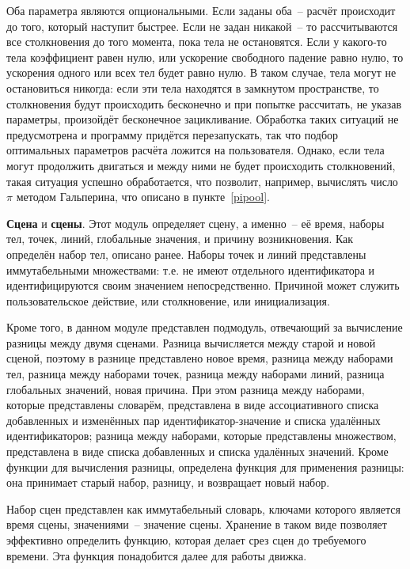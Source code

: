 Оба параметра являются опциональными. Если заданы оба~-- расчёт происходит до того, который наступит быстрее.
Если не задан никакой~-- то рассчитываются все столкновения до того момента, пока тела не остановятся.
Если у какого-то тела коэффициент равен нулю, или ускорение свободного падение равно нулю, то ускорения одного или всех тел будет равно нулю.
В таком случае, тела могут не остановиться никогда: если эти тела находятся в замкнутом пространстве, то столкновения будут происходить бесконечно
и при попытке рассчитать, не указав параметры, произойдёт бесконечное зацикливание. Обработка таких ситуаций не предусмотрена и программу придётся перезапускать,
так что подбор оптимальных параметров расчёта ложится на пользователя. Однако, если тела могут продолжить двигаться и между ними не будет происходить столкновений,
такая ситуация успешно обработается, что позволит, например, вычислять число \(\pi\) методом Гальперина, что описано в пункте~\ref{pipool}.

\textbf{Сцена} и \textbf{сцены}.\label{scenedescr}
Этот модуль определяет сцену, а именно~-- её время, наборы тел, точек, линий, глобальные значения, и причину возникновения.
Как определён набор тел, описано ранее. Наборы точек и линий представлены иммутабельными множествами: т.е. не имеют
отдельного идентификатора и идентифицируются своим значением непосредственно. Причиной может
служить пользовательское действие, или столкновение, или инициализация.

Кроме того, в данном модуле представлен подмодуль, отвечающий за вычисление разницы между двумя сценами.
Разница вычисляется между старой и новой сценой, поэтому в разнице представлено новое время,
разница между наборами тел, разница между наборами точек, разница между наборами линий, разница глобальных значений, новая причина.
При этом разница между наборами, которые представлены словарём, представлена в виде ассоциативного списка добавленных и изменённых пар
идентификатор-значение и списка удалённых идентификаторов;
разница между наборами, которые представлены множеством, представлена в виде списка добавленных и списка удалённых значений.
Кроме функции для вычисления разницы, определена функция для применения разницы: она принимает старый набор, разницу, и возвращает новый набор.

Набор сцен представлен как иммутабельный словарь, ключами которого является время сцены, значениями~-- значение сцены.
Хранение в таком виде позволяет эффективно определить функцию, которая делает срез сцен до требуемого времени.
Эта функция понадобится далее для работы движка.

